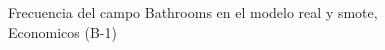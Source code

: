 \begin{figure}[H]
    \centering
    
    \caption{Frecuencia del campo Bathrooms en el modelo real y smote, Economicos (B-1)}
    \label{frecuency-Bathrooms-smote-enc}
\end{figure}